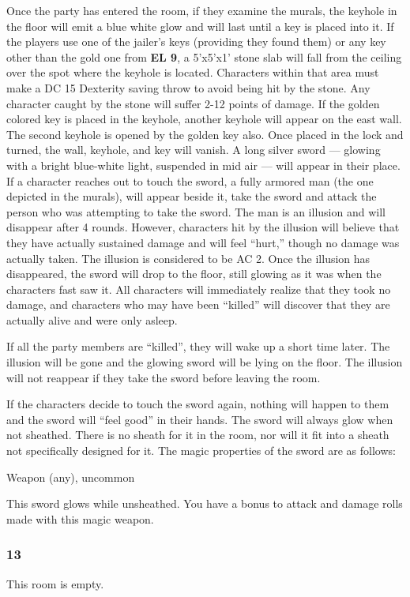 \documentclass[palace_of_the_silver_princess]{subfiles}
\begin{document}
Once the party has entered the room, if they examine the murals, the
keyhole in the floor will emit a blue white glow and will last until a
key is placed into it. If the players use one of the jailer's keys
(providing they found them) or any key other than the gold one from
\textbf{EL 9}, a 5’x5’x1’ stone slab will fall from the ceiling over the
spot where the keyhole is located. Characters within that area must make
a DC 15 Dexterity saving throw to avoid being hit by the stone. Any
character caught by the stone will suffer 2-12 points of damage. If the
golden colored key is placed in the keyhole, another keyhole will appear
on the east wall. The second keyhole is opened by the golden key also.
Once placed in the lock and turned, the wall, keyhole, and key will
vanish. A long silver sword — glowing with a bright blue-white light,
suspended in mid air — will appear in their place. If a character
reaches out to touch the sword, a fully armored man (the one depicted in
the murals), will appear beside it, take the sword and attack the person
who was attempting to take the sword. The man is an illusion and will
disappear after 4 rounds. However, characters hit by the illusion will
believe that they have actually sustained damage and will feel “hurt,”
though no damage was actually taken. The illusion is considered to be AC
2. Once the illusion has disappeared, the sword will drop to the floor,
still glowing as it was when the characters fast saw it. All characters
will immediately realize that they took no damage, and characters who
may have been “killed” will discover that they are actually alive and
were only asleep.

If all the party members are “killed”, they will wake up a short time
later. The illusion will be gone and the glowing sword will be lying on
the floor. The illusion will not reappear if they take the sword before
leaving the room.

If the characters decide to touch the sword again, nothing will happen
to them and the sword will “feel good” in their hands. The sword will
always glow when not sheathed. There is no sheath for it in the room,
nor will it fit into a sheath not specifically designed for it. The
magic properties of the sword are as follows:

{Weapon (any), uncommon}

This sword glows while unsheathed.  You have a bonus to attack and damage rolls made with this magic weapon.

\subsubsection{13}
This room is empty.
\end{document}
